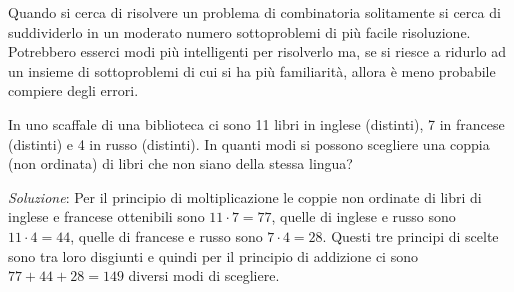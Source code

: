 Quando si cerca di risolvere un problema di combinatoria solitamente si cerca di suddividerlo
in un moderato numero sottoproblemi di più facile risoluzione. Potrebbero esserci modi più
intelligenti per risolverlo ma, se si riesce a ridurlo ad un insieme di sottoproblemi di cui
si ha più familiarità, allora è meno probabile compiere degli errori. 
\begin{ese}
	In uno scaffale di una biblioteca ci sono 11 libri in inglese (distinti), 7 in francese (distinti)
	e 4 in russo (distinti). In quanti modi si possono scegliere una coppia (non ordinata) di libri
	che non siano della stessa lingua?
	
	\emph{Soluzione}:
	Per il principio di moltiplicazione le coppie non ordinate di libri di inglese e francese
	ottenibili sono $11 \cdot 7 = 77$, quelle di inglese e russo sono $11 \cdot 4 = 44$, quelle
	di francese e russo sono $7 \cdot 4 = 28$.
	Questi tre principi di scelte sono tra loro disgiunti e quindi per il principio di addizione 
	ci sono $77 + 44 + 28 = 149$ diversi modi di scegliere.
	\QEDA
\end{ese}

